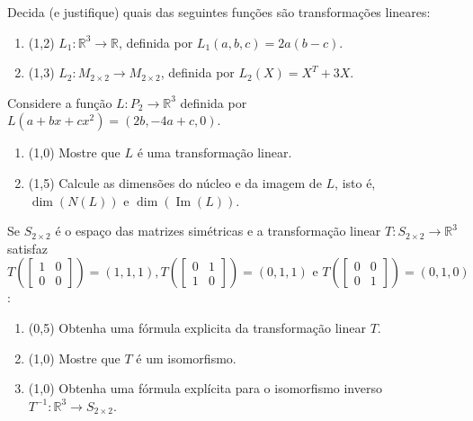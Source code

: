 \documentclass[12pt,a4paper]{article}
\newcommand{\fixme}{{\color{red}(...)}}
\newcommand*\im[1]{\operatorname{Im}\left(#1\right)}
\newcommand*\R{\mathbb{R}}
\begin{document}
\begin{ExerciseList}
\Exercise[title={2,5}] Decida (e justifique) quais das seguintes funções são transformações lineares:
\begin{enumerate}
\item (1,2) $L_1: \R^3 \to \R$, definida por $L_1(a,b,c) = 2a(b-c)$.
\item (1,3) $L_2: M_{2 \times 2} \to M_{2 \times 2}$, definida por $L_2(X) = X^T + 3X$.
\end{enumerate}
\Answer \fixme


\Exercise[title={2,5}] Considere a função $L: P_2 \to \R^3$ definida por $L(a + bx +cx^2) = (2b, -4a+c, 0)$.
\begin{enumerate}
\item (1,0) Mostre que $L$ é uma transformação linear.
\item (1,5) Calcule as dimensões do núcleo e da imagem de $L$, isto é, $\dim(N(L))$ e $\dim(\im{L})$.
\end{enumerate}
\Answer \fixme



\Exercise[title={2,5}] Se $S_{2\times 2}$ é o espaço das matrizes simétricas e a transformação linear $T:S_{2\times 2} \to \R^3$ satisfaz
$
T\left( \begin{bmatrix}
1 & 0\\
0 & 0
\end{bmatrix} \right) = (1,1,1),
T\left( \begin{bmatrix}
0 & 1\\
1 & 0
\end{bmatrix} \right) = (0,1,1) \text{ e }
T\left( \begin{bmatrix}
0 & 0\\
0 & 1
\end{bmatrix} \right) = (0,1,0)$:
\begin{enumerate}
\item (0,5) Obtenha uma fórmula explicita da transformação linear $T$.
\item (1,0) Mostre que $T$ é um isomorfismo.
\item (1,0) Obtenha uma fórmula explícita para o isomorfismo inverso $T^{-1}: \R^3 \to S_{2 \times 2}$.
\end{enumerate}

\end{ExerciseList}


\end{document}
